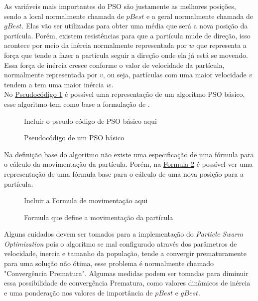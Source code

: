         As variáveis mais importantes do PSO são justamente as melhores posições, sendo a local normalmente chamada de $pBest$ e a geral normalmente chamada de $gBest$. Elas vão ser utilizadas para obter uma média que será a nova posição da partícula. Porém, existem resistências para que a partícula mude de direção, isso acontece por meio da inércia normalmente representada por $w$ que representa a força que tende a fazer a partícula seguir a direção onde ela já está se movendo. Essa força de inércia cresce conforme o valor de velocidade da partícula, normalmente representada por $v$, ou seja, partículas com uma maior velocidade $v$ tendem a tem uma maior inércia $w$.\\
        
        No \hyperref[alg:pso-base]{Pseudocódigo \ref{alg:pso-base}} 
        é possível uma representação de um algoritmo PSO básico, esse algoritmo tem como base a formulação de \cite{martinez2009}.
        
        \begin{figure}[h]
            \centering
            \small{Incluir o pseudo código de PSO básico aqui}
            \caption{Pseudocódigo de um PSO básico}
            \label{alg:pso-base}
        \end{figure}

        Na definição base do algoritmo não existe uma especificação de uma fórmula para o cálculo da movimentação da partícula. Porém, na 
        \hyperref[fig:formula-movimentacao]{Formula \ref{fig:formula-movimentacao}} 
        é possível ver uma representação de uma fórmula base para o cálculo de uma nova posição para a partícula.
                
        \begin{figure}[h]
            \centering
            \small{Incluir a Formula de movimentação aqui}
            \caption{Formula que define a movimentação da partícula}
            \label{fig:formula-movimentacao}
        \end{figure}

    

        Alguns cuidados devem ser tomados para a implementação do \textit{Particle Swarm Optimization} pois o algoritmo se mal configurado através dos parâmetros de velocidade, inercia e tamanho da população, tende a convergir prematuramente para uma solução não ótima, esse problema é normalmente chamado "Convergência Prematura".
        Algumas medidas podem ser tomadas para diminuir essa possibilidade de convergência Prematura, como valores dinâmicos de inércia e uma ponderação nos valores de importância de $pBest$ e $gBest$.\\


